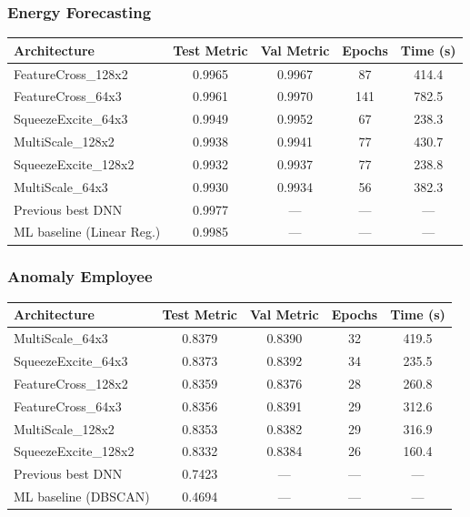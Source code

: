 \documentclass[11pt,a4paper]{article}
\begin{document}
\subsubsection*{Energy Forecasting}

\begin{center}
\small
\begin{tabular}{lcccc}
\toprule
\textbf{Architecture} & \textbf{Test Metric} & \textbf{Val Metric} & \textbf{Epochs} & \textbf{Time (s)} \\
\midrule
FeatureCross\_128x2 & 0.9965 & 0.9967 & 87 & 414.4 \\
FeatureCross\_64x3 & 0.9961 & 0.9970 & 141 & 782.5 \\
SqueezeExcite\_64x3 & 0.9949 & 0.9952 & 67 & 238.3 \\
MultiScale\_128x2 & 0.9938 & 0.9941 & 77 & 430.7 \\
SqueezeExcite\_128x2 & 0.9932 & 0.9937 & 77 & 238.8 \\
MultiScale\_64x3 & 0.9930 & 0.9934 & 56 & 382.3 \\
\midrule
Previous best DNN & 0.9977 & --- & --- & --- \\
ML baseline (Linear Reg.) & 0.9985 & --- & --- & --- \\
\bottomrule
\end{tabular}
\end{center}

\subsubsection*{Anomaly Employee}

\begin{center}
\small
\begin{tabular}{lcccc}
\toprule
\textbf{Architecture} & \textbf{Test Metric} & \textbf{Val Metric} & \textbf{Epochs} & \textbf{Time (s)} \\
\midrule
MultiScale\_64x3 & 0.8379 & 0.8390 & 32 & 419.5 \\
SqueezeExcite\_64x3 & 0.8373 & 0.8392 & 34 & 235.5 \\
FeatureCross\_128x2 & 0.8359 & 0.8376 & 28 & 260.8 \\
FeatureCross\_64x3 & 0.8356 & 0.8391 & 29 & 312.6 \\
MultiScale\_128x2 & 0.8353 & 0.8382 & 29 & 316.9 \\
SqueezeExcite\_128x2 & 0.8332 & 0.8384 & 26 & 160.4 \\
\midrule
Previous best DNN & 0.7423 & --- & --- & --- \\
ML baseline (DBSCAN) & 0.4694 & --- & --- & --- \\
\bottomrule
\end{tabular}
\end{center}
\end{document}
